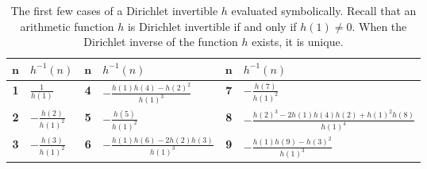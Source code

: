 \documentclass[12pt,reqno,a4letter]{article}
\numberwithin{figure}{section}
\numberwithin{table}{section}
\numberwithin{equation}{section}
\theoremstyle{plain}
\numberwithin{theorem}{section}
\theoremstyle{definition}
\begin{document}
\begin{table}[h!]

\begin{center}
\begin{tabular}{|c|l|c|l|c|l|} \hline 
$\mathbf{n}$ & $h^{-1}(n)$ & $\mathbf{n}$ & $h^{-1}(n)$ & $\mathbf{n}$ & $h^{-1}(n)$ \\ \hline 
\textbf{1} & $\displaystyle\frac{1}{h(1)}$ & \textbf{4} & $-\displaystyle\frac{h(1) h(4)-h(2)^2}{h(1)^3}$ & 
\textbf{7} & $-\displaystyle\frac{h(7)}{h(1)^2}$ \\ 
\textbf{2} & $-\displaystyle\frac{h(2)}{h(1)^2}$ & \textbf{5} & $-\displaystyle\frac{h(5)}{h(1)^2}$ & 
\textbf{8} & $-\displaystyle\frac{h(2)^3-2 h(1) h(4) h(2)+h(1)^2 h(8)}{h(1)^4}$ \\ 
\textbf{3} & $-\displaystyle\frac{h(3)}{h(1)^2}$ & \textbf{6} & $-\displaystyle\frac{h(1) h(6)-2 h(2) h(3)}{h(1)^3}$ & 
\textbf{9} & $-\displaystyle\frac{h(1) h(9)-h(3)^2}{h(1)^3}$ \\ \hline 
\end{tabular} 
\end{center} 

\caption[Symbolic computations of the Dirichlet inverse of a function]{
	 The first few cases of a Dirichlet invertible $h$ evaluated symbolically. 
         Recall that an arithmetic function $h$ is Dirichlet invertible if and only if 
         $h(1) \neq 0$. When the Dirichlet inverse of the function $h$ exists, it is unique. }

\end{table}
\end{document}
